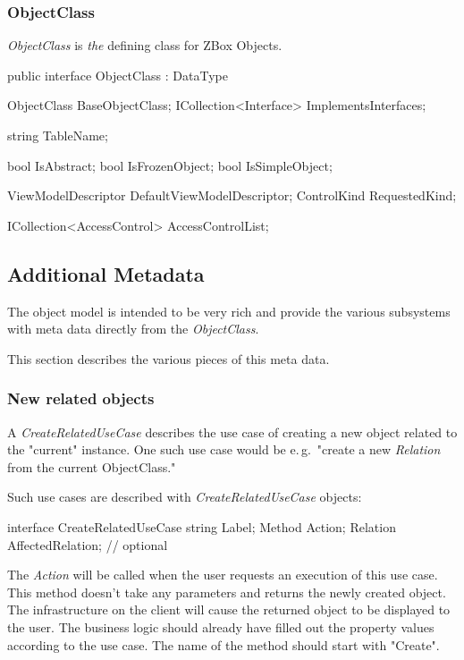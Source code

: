 \subsubsection{ObjectClass}
\emph{ObjectClass} is \emph{the} defining class for ZBox Objects.

\begin{CS}
public interface ObjectClass : DataType 
{
    ObjectClass BaseObjectClass;
    ICollection<Interface> ImplementsInterfaces;

    string TableName;

    bool IsAbstract;
    bool IsFrozenObject;
    bool IsSimpleObject;

    ViewModelDescriptor DefaultViewModelDescriptor;
    ControlKind RequestedKind;

    ICollection<AccessControl> AccessControlList;
}
\end{CS}



\subsection{Additional Metadata}

The object model is intended to be very rich and provide the various
subsystems with meta data directly from the \emph{ObjectClass}.

This section describes the various pieces of this meta data.

\subsubsection{New related objects}

A \emph{CreateRelatedUseCase} describes the use case of creating a new
object related to the "current" instance. One such use case would be
e.\,g.~"create a new \emph{Relation} from the current ObjectClass."

Such use cases are described with \emph{CreateRelatedUseCase} objects:

\begin{CS}
interface CreateRelatedUseCase
{
	string Label;
	Method Action;
	Relation AffectedRelation; // optional
}
\end{CS}

The \emph{Action} will be called when the user requests an execution of
this use case. This method doesn't take any parameters and returns the
newly created object. The infrastructure on the client will cause the
returned object to be displayed to the user. The business logic should
already have filled out the property values according to the use case.
The name of the method should start with "Create".

